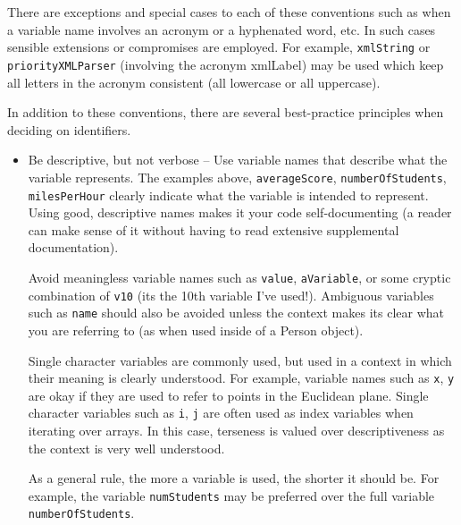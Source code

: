There are exceptions and special cases to each of these conventions such
as when a variable name involves an acronym or a hyphenated word, etc.  In such
cases sensible extensions or compromises are employed.  For example, 
\texttt{xmlString} or \texttt{priorityXMLParser} (involving the acronym 
\gls{xmlLabel}) may be used which keep all letters in the acronym consistent (all lowercase or all uppercase).

In addition to these conventions, there are several best-practice principles when deciding
on identifiers.
\begin{itemize}
  \item Be descriptive, but not verbose -- Use variable names that describe what the
  	variable represents.  The examples above, \texttt{averageScore}, 
	\texttt{numberOfStudents}, \texttt{milesPerHour} clearly indicate
	what the variable is intended to represent.  Using good, descriptive names makes it
	your code self-documenting (a reader can make sense of it without having to 
	read extensive supplemental documentation).

	Avoid meaningless variable names such as \texttt{value}, \texttt{aVariable}, 
	or some cryptic combination of \texttt{v10} (its the 10th variable I've used!).  
	Ambiguous variables such as \texttt{name} should also be avoided unless the
	context makes its clear what you are referring to (as when used inside of a Person
	object).
	
	Single character variables are commonly used, but used in a context in which their
	meaning is clearly understood.  For example, variable names such as \texttt{x},
	\texttt{y} are okay if they are used to refer to points in the Euclidean plane.  
	Single character variables such as \texttt{i}, \texttt{j} are often used
	as index variables when iterating over arrays.  In this case, terseness is valued over
	descriptiveness as the context is very well understood. 
	
	As a general rule, the more a variable is used, the shorter it should be.  For example,
	the variable \texttt{numStudents} may be preferred over the full variable 
	\texttt{numberOfStudents}.
	

\end{itemize}
